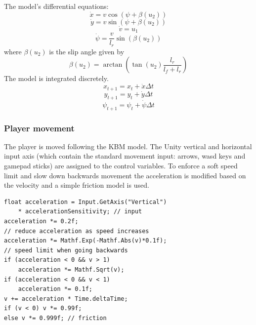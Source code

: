 \documentclass[12pt]{article}
\begin{document}
The model's differential equations:
\begin{equation}\dot{x} = v \cos(\psi + \beta (u_2)) \end{equation}
\begin{equation}\dot{y} = v \sin(\psi + \beta (u_2)) \end{equation}
\begin{equation}\dot{v} = u_1 \end{equation}
\begin{equation}\dot{\psi} = \frac{v} {l_r} \sin(\beta(u_2)) \end{equation}
\medskip
where \( \beta(u_2) \) is the slip angle given by
\begin{equation} \beta(u_2) = \arctan (\tan(u_2) \frac{l_r} { l_f + l_r })  \end{equation}
\bigskip
The model is integrated discretely.
\begin{equation} x_{t+1} = x_t + \dot{x}\Delta t \end{equation}
\begin{equation} y_{t+1} = y_t + \dot{y}\Delta t \end{equation}
\begin{equation} {\psi}_{t+1} = {\psi}_t + \dot{\psi}\Delta t\end{equation}

\bigskip

\clearpage

\subsubsection{Player movement}
The player is moved following the KBM model. The Unity vertical and horizontal input axis (which contain the standard movement input: arrows, wasd keys and gamepad sticks) are assigned to the control variables. To enforce a soft speed limit and slow down backwards movement the acceleration is modified based on the velocity and a simple friction model is used.

\lstset{style=sharpc}
\begin{lstlisting}
float acceleration = Input.GetAxis("Vertical") 
    * accelerationSensitivity; // input
acceleration *= 0.2f;
// reduce acceleration as speed increases
acceleration *= Mathf.Exp(-Mathf.Abs(v)*0.1f);
// speed limit when going backwards
if (acceleration < 0 && v > 1)
    acceleration *= Mathf.Sqrt(v);
if (acceleration < 0 && v < 1) 
    acceleration *= 0.1f;
v += acceleration * Time.deltaTime;
if (v < 0) v *= 0.99f;
else v *= 0.999f; // friction
\end{lstlisting}
\end{document}

